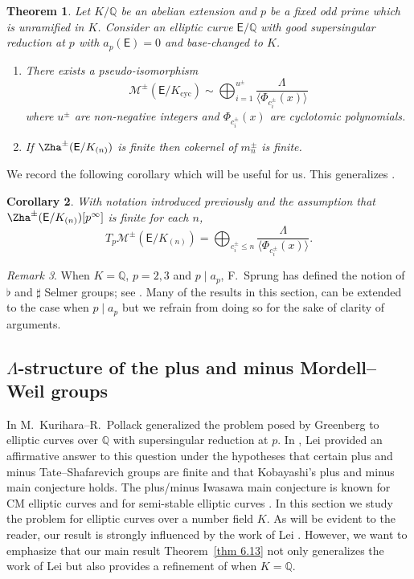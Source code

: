 \documentclass{amsart}
\newtheorem{theorem}{Theorem}[section]
\newtheorem{corollary}[theorem]{Corollary}
\numberwithin{equation}{section}
\theoremstyle{remark}
\newtheorem{remark}[theorem]{Remark}
\newcommand{\EC}{\mathsf{E}}
\newcommand{\cM}{\mathcal{M}}
\newcommand{\Q}{\mathbb{Q}}
\newcommand{\cyc}{\operatorname{{cyc}}}
\theoremstyle{plain} %
\begin{document}
\begin{theorem}
Let $K/\Q$ be an abelian extension and $p$ be a fixed odd prime which is unramified in $K$.
Consider an elliptic curve $\EC/\Q$ with good \emph{supersingular} reduction at $p$ with $a_p(\EC)=0$ and base-changed to $K$.
\begin{enumerate}
\item[\textup{(}i\textup{)}] There exists a pseudo-isomorphism
\begin{equation}
\label{pseudo for Mpm}
\cM^{\pm}(\EC/K_{\cyc}) \sim \bigoplus_{i=1}^{u^{\pm}} \frac{\Lambda}{\langle \Phi_{c^{\pm}_i}(x) \rangle}
\end{equation}
where $u^{\pm}$ are non-negative integers and $\Phi_{c^{\pm}_i}(x)$ are cyclotomic polynomials.
\item[\textup{(}ii\textup{)}] If $\Zha^{\pm}(\EC/K_{(n)})$ is finite then cokernel of $m_n^{\pm}$ is finite.
\end{enumerate}
\end{theorem}

We record the following corollary which will be useful for us.
This generalizes \cite[Remark~5.6]{Lei23}.

\begin{corollary}
\label{Remark 5.6 Antonio}   
With notation introduced previously and the assumption that $\Zha^{\pm}(\EC/K_{(n)})[p^\infty]$ is finite for each $n$,
\[
T_p\cM^{\pm}(\EC/K_{(n)}) = \bigoplus_{c_i^{\pm} \leq n} \frac{\Lambda}{\langle \Phi_{c^{\pm}_i}(x) \rangle}.
\]
\end{corollary}



\begin{remark}
When $K=\Q$, $p=2,3$ and $p\mid a_p$, F.~Sprung has defined the notion of $\flat$ and $\sharp$ Selmer groups; see \cite{Spr12}.
Many of the results in this section, can be extended to the case when $p\mid a_p$ but we refrain from doing so for the sake of clarity of arguments.
\end{remark}

\subsection{\texorpdfstring{$\Lambda$}{}-structure of the plus and minus Mordell--Weil groups}

In \cite{KP07} M.~Kurihara--R.~Pollack generalized the problem posed by Greenberg to elliptic curves over $\Q$ with supersingular reduction at $p$.
In \cite[Theorem~D]{Lei23}, Lei provided an affirmative answer to this question under the hypotheses that certain plus and minus Tate--Shafarevich groups are finite and that Kobayashi’s plus and minus main conjecture holds.
The plus/minus Iwasawa main conjecture is known for CM elliptic curves \cite{PK04} and for semi-stable elliptic curves \cite{BSTW}.
In this section we study the problem for elliptic curves over a number field $K$.
As will be evident to the reader, our result is strongly influenced by the work of Lei \cite{Lei23}.
However, we want to emphasize that our main result Theorem~\ref{thm 6.13} not only generalizes the work of Lei but also provides a refinement of \cite[Theorem~D]{Lei23} when $K=\Q$.
\end{document}
